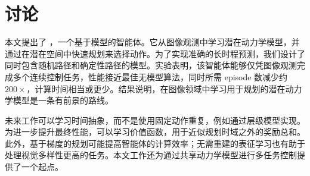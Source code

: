 \section{讨论}
\label{discussion}

本文提出了 \method{}，一个基于模型的智能体。它从图像观测中学习潜在动力学模型，并通过在潜在空间中快速规划来选择动作。为了实现准确的长时程预测，我们设计了同时包含随机路径和确定性路径的模型。实验表明，该智能体能够仅凭图像观测完成多个连续控制任务，性能接近最佳无模型算法，同时所需 episode 数减少约 $200\times$，计算时间相当或更少。结果说明，在图像领域中学习用于规划的潜在动力学模型是一条有前景的路线。

未来工作可以学习时间抽象，而不是使用固定动作重复，例如通过层级模型实现。为进一步提升最终性能，可以学习价值函数，用于近似规划时域之外的奖励总和。此外，基于梯度的规划可能提高智能体的计算效率；无需重建的表征学习也有助于处理视觉多样性更高的任务。本文工作还为通过共享动力学模型进行多任务控制提供了一个起点。
